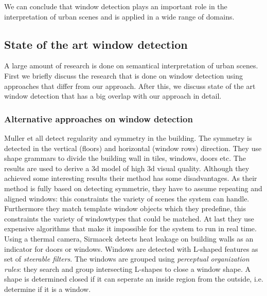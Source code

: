 We can conclude that window detection plays an important role in the
interpretation of urban scenes and is applied in a wide range of domains.  



\subsection{State of the art window detection} %
A large amount of research is done on semantical interpretation of urban scenes. 
First we briefly discuss the research that is done on window detection using
approaches that differ from our approach.  After this, we discuss state of the art
window detection that has a big overlap with our approach in detail.\\

\subsubsection{Alternative approaches on window detection}
Muller et all \cite{Muller_procedural} detect regularity and symmetry in the building. The
symmetry is detected in the vertical (floors) and horizontal (window
rows) direction.
They use shape grammars to divide the building wall in tiles, windows, doors etc.
The results are used to derive a 3d model of high 3d visual quality.
Although they achieved some interesting results their method has some
disadvantages.  As their method is fully based on detecting symmetrie, they have
to assume repeating and aligned windows: this constraints the variety of scenes
the system can handle.
Furthermore they match template window objects which they predefine, this 
constraints the variety of windowtypes that could be matched.  At last 
they use expensive algorithms that make it impossible for the system
to run in real time.  \\

Using a thermal camera, Sirmacek \cite{Sirmacek_thermal}
detects heat leakage on building walls as an indicator for doors or windows.
Windows are detected with L-shaped features as set of \emph{steerable filters}.
The windows are grouped using \emph{perceptual organization rules}:
they search and group intersecting L-shapes to close a window shape. A shape is
determined closed if it can seperate an inside region from the outside, i.e.
determine if it is a window.  \\

